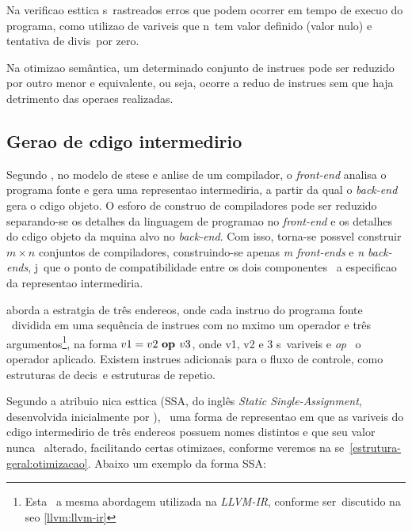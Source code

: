 Na verifica\ca o est\ah tica s\ao\ rastreados erros que podem ocorrer em tempo de execu\ca o do programa, como utiliza\ca o de vari\ah veis que n\ao\ tem valor definido (valor nulo) e tentativa de divis\ao\ por zero.

Na otimiza\ca o sem\^antica, um determinado conjunto de instru\co es pode ser reduzido por outro menor e equivalente, ou seja, ocorre a redu\ca o de instru\co es sem que haja detrimento das opera\co es realizadas.

\subsection{Gera\ca o de c\oh digo intermedi\ah rio}
\label{revisao:estrutura-geral:geracao-codigo}

Segundo \cite{Aho08}, no modelo de s\ih tese e an\ah lise de um compilador, o \emph{front-end} analisa o programa fonte e gera uma representa\ca o intermedi\ah ria, a partir da qual o \emph{back-end} gera o c\oh digo objeto. O esfor\cc o de constru\ca o de compiladores pode ser reduzido separando-se os detalhes da linguagem de programa\ca o no \emph{front-end} e os detalhes do c\oh digo objeto da m\ah quina alvo no \emph{back-end}. Com isso, torna-se poss\ih vel construir \(m \times n\) conjuntos de compiladores, construindo-se apenas \emph{m front-ends} e \emph{n back-ends}, j\ah\ que o ponto de compatibilidade entre os dois componentes \eh\ a especifica\ca o da representa\ca o intermedi\ah ria.

\cite{Aho08} aborda a estrat\eh gia de tr\^es endere\cc os, onde cada instru\ca o do programa fonte \eh\ dividida em uma sequ\^encia de instru\co es com no m\ah ximo um operador e tr\^es argumentos\footnote{Esta \eh\ a mesma abordagem utilizada na \emph{LLVM-IR}, conforme ser\ah\ discutido na se\ca o \ref{llvm:llvm-ir}}, na forma \( v1 = v2 \mbox{ \bf{op} } v3 \), onde v1, v2 e 3 s\ao\ vari\ah veis e \emph{op} \eh\ o operador aplicado. Existem instru\co es adicionais para o fluxo de controle, como estruturas de decis\ao\ e estruturas de repeti\ca o.

Segundo \cite{Aho08} a atribui\ca o \uh nica est\ah tica (SSA, do ingl\^es \emph{Static Single-Assignment}, desenvolvida inicialmente por \cite{Cytron91}), \eh\ uma forma de representa\ca o em que as vari\ah veis do c\oh digo intermedi\ah rio de tr\^es endere\cc os possuem nomes distintos e que seu valor nunca \eh\ alterado, facilitando certas otimiza\co es, conforme veremos na se\cc \ao\ \ref{estrutura-geral:otimizacao}. Abaixo um exemplo da forma SSA:

